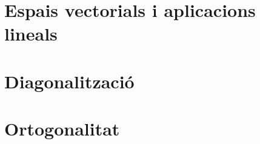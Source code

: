 \documentclass[11pt,fleqn]{book} %
\newcounter{let} \setcounter{let}{0}
\renewcommand{\1}{\mathbf{1}}
\newcommand{\0}{\mathbf{0}}
\begin{document}
\chapter{Espais vectorials i aplicacions lineals}
{
\let\subsection\subsubsection
\let\subsubsection\paragraph

}
\chapter{Diagonalització}
{
\let\subsection\subsubsection
\let\subsubsection\paragraph

}
\chapter{Ortogonalitat}
{
\let\subsection\subsubsection
\let\subsubsection\paragraph

}
\end{document}
